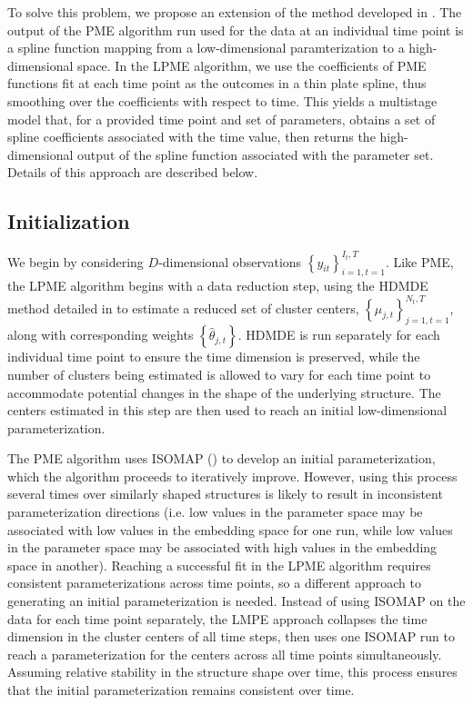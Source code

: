 \documentclass[11pt,reqno]{article}
\theoremstyle{definition}
\begin{document}
To solve this problem, we propose an extension of the method developed in \cite{mengPrincipalManifoldEstimation2021}. The output of the PME algorithm run used for the data at an individual time point is a spline function mapping from a low-dimensional paramterization to a high-dimensional space. In the LPME algorithm, we use the coefficients of PME functions fit at each time point as the outcomes in a thin plate spline, thus smoothing over the coefficients with respect to time. This yields a multistage model that, for a provided time point and set of parameters, obtains a set of spline coefficients associated with the time value, then returns the high-dimensional output of the spline function associated with the parameter set. Details of this approach are described below.

\subsection*{Initialization}
We begin by considering $D$-dimensional observations $\left\{y_{it}\right\}_{i=1, t=1}^{I_t, T}$. Like PME, the LPME algorithm begins with a data reduction step, using the HDMDE method detailed in \cite{mengPrincipalManifoldEstimation2021} to estimate a reduced set of cluster centers, $\left\{\mu_{j, t}\right\}_{j=1, t=1}^{N_t, T}$, along with corresponding weights $\left\{\hat{\theta}_{j, t}\right\}$. HDMDE is run separately for each individual time point to ensure the time dimension is preserved, while the number of clusters being estimated is allowed to vary for each time point to accommodate potential changes in the shape of the underlying structure. The centers estimated in this step are then used to reach an initial low-dimensional parameterization.

The PME algorithm uses ISOMAP (\cite{tenenbaumGlobalGeometricFramework2000}) to develop an initial parameterization, which the algorithm proceeds to iteratively improve. However, using this process several times over similarly shaped structures is likely to result in inconsistent parameterization directions (i.e. low values in the parameter space may be associated with low values in the embedding space for one run, while low values in the parameter space may be associated with high values in the embedding space in another). Reaching a successful fit in the LPME algorithm requires consistent parameterizations across time points, so a different approach to generating an initial parameterization is needed. Instead of using ISOMAP on the data for each time point separately, the LMPE approach collapses the time dimension in the cluster centers of all time steps, then uses one ISOMAP run to reach a parameterization for the centers across all time points simultaneously. Assuming relative stability in the structure shape over time, this process ensures that the initial parameterization remains consistent over time.
\end{document}

